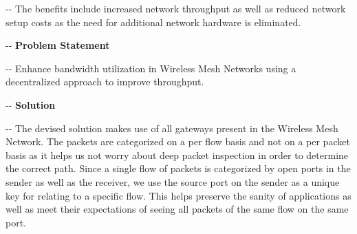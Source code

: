 \documentclass[12pt]{article}
\makeatletter
\newenvironment{indentation}[3]%
	{\par\setlength{\parindent}{#3}
	\setlength{\leftmargin}{#1}       \setlength{\rightmargin}{#1}%
	\advance\linewidth -\leftmargin       \advance\linewidth -\rightmargin%
	\advance\@totalleftmargin\leftmargin  \@setpar{{\@@par}}%
	\parshape 1\@totalleftmargin \linewidth\ignorespaces}{\par}%
\makeatother
\begin{document}
\begin{indentation}{0pt}{0pt}{0pt}
{\normalsize \hspace{1cm}The benefits include increased network throughput as well as reduced network setup costs as the need for additional network hardware is eliminated.}
\end{indentation}
\pagebreak

\begin{indentation}{0pt}{0pt}{0pt}
\vspace{1cm}
\textbf{{{\Large Problem Statement}}}
\end{indentation}
\vspace{0.5cm}

\begin{indentation}{0pt}{0pt}{0pt}
{\normalsize \hspace{1cm} Enhance bandwidth utilization in Wireless Mesh Networks using a decentralized approach to improve throughput.}
\end{indentation}

\begin{indentation}{0pt}{0pt}{0pt}
\vspace{1cm}
\textbf{{{\Large Solution}}}
\end{indentation}
\vspace{0.5cm}
\begin{indentation}{0pt}{0pt}{0pt}
{\normalsize \hspace{1cm} The devised solution makes use of all gateways present in the Wireless Mesh Network. The packets are categorized on a per flow basis and not on a per packet basis as it helps us not worry about deep packet inspection in order to determine the correct path. Since a single flow of packets is categorized by open ports in the sender as well as the receiver, we use the source port on the sender as a unique key for relating to a specific flow. This helps preserve the sanity of applications as well as meet their expectations of seeing all packets of the same flow on the same port.}
\end{indentation}
\end{document}
